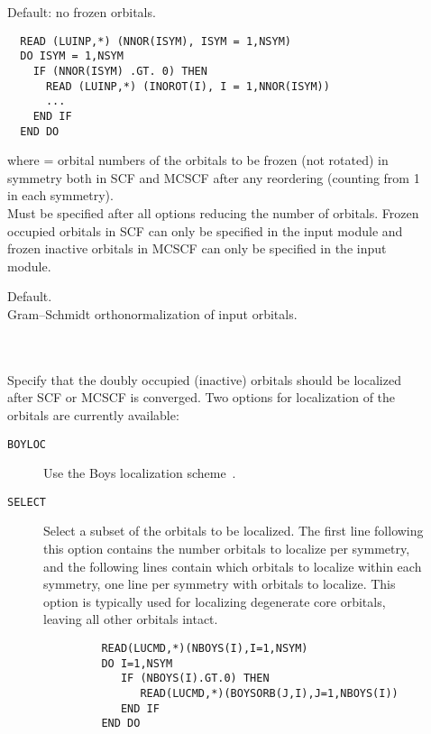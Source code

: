 \begin{description}
\item[]
  Default: no frozen orbitals.
\begin{verbatim}
  READ (LUINP,*) (NNOR(ISYM), ISYM = 1,NSYM)
  DO ISYM = 1,NSYM
    IF (NNOR(ISYM) .GT. 0) THEN
      READ (LUINP,*) (INOROT(I), I = 1,NNOR(ISYM))
      ...
    END IF
  END DO
\end{verbatim}
  where  = orbital numbers of the orbitals to be
          frozen (not rotated)
          in symmetry  both in SCF and MCSCF
          after any reordering (counting from 1 in each symmetry).\\
  Must be specified after all options reducing the number of orbitals.
  Frozen occupied orbitals in SCF can only be specified in the  input module
  and frozen inactive orbitals in MCSCF can only be specified in the 
  input module.

\item[]
  Default.\\
  Gram--Schmidt orthonormalization of input orbitals.

\item[] \ \\
   \\
  Specify that the doubly occupied (inactive) orbitals should be localized after SCF 
  or MCSCF is converged.
  Two options for localization of the orbitals are currently available:
  \begin{description}
  \item[{\tt BOYLOC\ }] Use the Boys localization scheme~\cite{Boyloc}.
  \item[{\tt SELECT\ }] Select a subset of the orbitals to be localized. The first
  line following this option contains the number orbitals to localize per symmetry,
  and the following lines contain which orbitals to localize within each symmetry,
  one line per symmetry with orbitals to localize.
  This option is typically used for localizing degenerate 
  core orbitals, leaving all other orbitals intact.
  \begin{verbatim}
         READ(LUCMD,*)(NBOYS(I),I=1,NSYM)
         DO I=1,NSYM
            IF (NBOYS(I).GT.0) THEN
               READ(LUCMD,*)(BOYSORB(J,I),J=1,NBOYS(I))
            END IF
         END DO
   \end{verbatim}
  \end{description}


\end{description}
